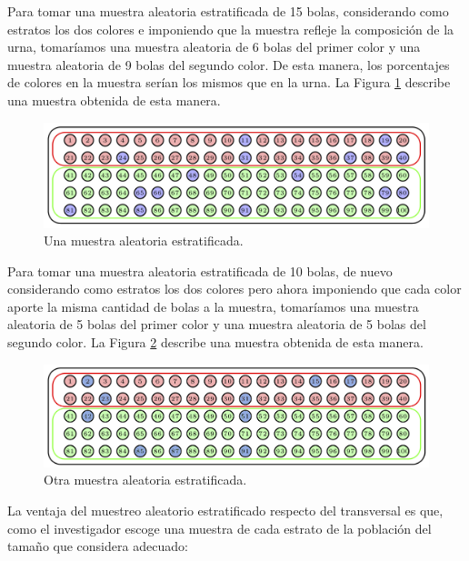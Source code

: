 \documentclass[
]{book}
\theoremstyle{definition}
\theoremstyle{definition}
\theoremstyle{definition}
\theoremstyle{definition}
\theoremstyle{remark}
\begin{document}
Para tomar una muestra aleatoria estratificada de 15 bolas, considerando como estratos los dos colores e imponiendo que la muestra refleje la composición de la urna, tomaríamos una muestra aleatoria de 6 bolas del primer color y una muestra aleatoria de 9 bolas del segundo color. De esta manera, los porcentajes de colores en la muestra serían los mismos que en la urna. La Figura \ref{fig:estrat} describe una muestra obtenida de esta manera.

\begin{figure}

{\centering \includegraphics[width=0.8\linewidth]{INREMDN_files/figure-html/estrat} 

}

\caption{Una muestra aleatoria estratificada.}\label{fig:estrat}
\end{figure}

Para tomar una muestra aleatoria estratificada de 10 bolas, de nuevo considerando como estratos los dos colores pero ahora imponiendo que cada color aporte la misma cantidad de bolas a la muestra, tomaríamos una muestra aleatoria de 5 bolas del primer color y una muestra aleatoria de 5 bolas del segundo color. La Figura \ref{fig:estrathom} describe una muestra obtenida de esta manera.

\begin{figure}

{\centering \includegraphics[width=0.8\linewidth]{INREMDN_files/figure-html/estrathom} 

}

\caption{Otra muestra aleatoria estratificada.}\label{fig:estrathom}
\end{figure}

La ventaja del muestreo aleatorio estratificado respecto del transversal es que, como el investigador escoge una muestra de cada estrato de la población del tamaño que considera adecuado:
\end{document}
